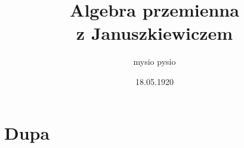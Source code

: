 \documentclass{article}
\title{Algebra przemienna\smallskip\\{\scriptsize z Januszkiewiczem}}
\author{mysio pysio}
\date{18.05.1920}
\begin{document}
\maketit

\tableofcontents
\newpage

\section{Dupa}
\end{document}
